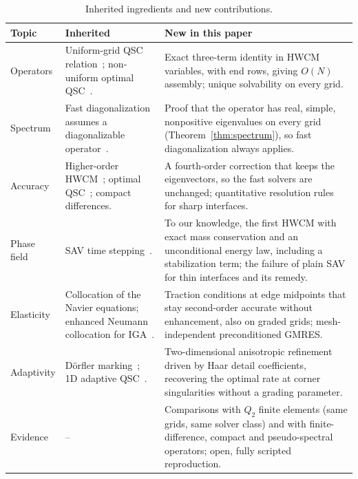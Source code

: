 \documentclass[preprint,12pt]{elsarticle}
\theoremstyle{remark}
\begin{document}
\begin{table}[t]\centering\small
\caption{Inherited ingredients and new contributions.}\label{tab:novelty}
\begin{tabular}{p{2.5cm}p{4.9cm}p{6.1cm}}
\toprule
Topic & Inherited & New in this paper\\
\midrule
Operators & Uniform-grid QSC relation~\cite{houstis1988quadratic}; non-uniform optimal QSC~\cite{christara2006optimal}. & Exact three-term identity in HWCM variables, with end rows, giving $O(N)$ assembly; unique solvability on every grid. \\
Spectrum & Fast diagonalization assumes a diagonalizable operator~\cite{lynch1964direct}. & Proof that the operator has real, simple, nonpositive eigenvalues on every grid (Theorem~\ref{thm:spectrum}), so fast diagonalization always applies. \\
Accuracy & Higher-order HWCM~\cite{majak2018higher}; optimal QSC~\cite{christara1994quadratic}; compact differences. & A fourth-order correction that keeps the eigenvectors, so the fast solvers are unchanged; quantitative resolution rules for sharp interfaces. \\
Phase field & SAV time stepping~\cite{shen2018scalar}. & To our knowledge, the first HWCM with exact mass conservation and an unconditional energy law, including a stabilization term; the failure of plain SAV for thin interfaces and its remedy. \\
Elasticity & Collocation of the Navier equations; enhanced Neumann collocation for IGA~\cite{delorenzis2015isogeometric}. & Traction conditions at edge midpoints that stay second-order accurate without enhancement, also on graded grids; mesh-independent preconditioned GMRES. \\
Adaptivity & D\"orfler marking~\cite{dorfler1996convergent}; 1D adaptive QSC~\cite{christara2006adaptive}. & Two-dimensional anisotropic refinement driven by Haar detail coefficients, recovering the optimal rate at corner singularities without a grading parameter. \\
Evidence & -- & Comparisons with $Q_2$ finite elements (same grids, same solver class) and with finite-difference, compact and pseudo-spectral operators; open, fully scripted reproduction. \\
\bottomrule
\end{tabular}
\end{table}
\end{document}
